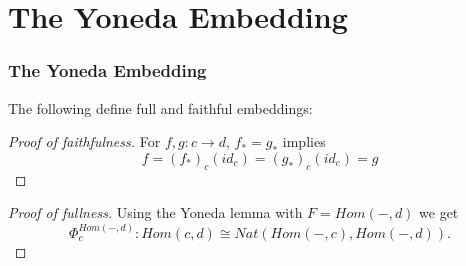 \documentclass[10.5pt,compress]{beamer}
\begin{document}
\section{The Yoneda Embedding}
\begin{frame}[fragile]\label{frame : the yoneda embedding}

\frametitle{The Yoneda Embedding}

The following define full and faithful embeddings:

\end{frame}


\begin{frame}\label{frame : proof of faithfulness}
\begin{proof}[Proof of faithfulness]
For $f, g : c \to d$, $f_* = g_*$ implies 
 \[f = (f_*)_c(id_c) = (g_*)_c(id_c) = g \]  

\end{proof}
\end{frame}


\begin{frame}[fragile]\label{frame : proof of fullness}
\begin{proof}[Proof of fullness]
Using the Yoneda lemma with $F = Hom(-,d)$ we get
\[ \Phi^{Hom(-,d)}_c : Hom(c,d) \cong Nat(Hom(-,c), Hom(-,d)). \]
\end{proof}
\end{frame}
\end{document}
